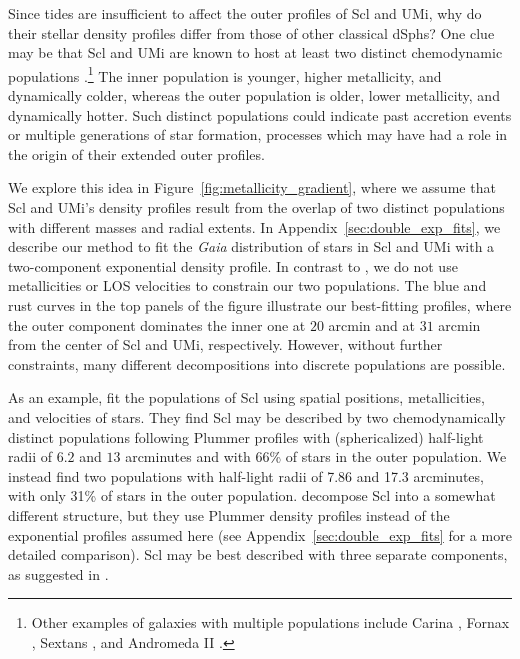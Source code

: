 \documentclass[times,trackchanges, twocolumn, twocolappendix]{aastex701}
\makeatletter
\DeclareRobustCommand\citepos
  {\begingroup
   \let\NAT@nmfmt\NAT@posfmt%
   \NAT@swafalse\let\NAT@ctype\z@\NAT@partrue
   \@ifstar{\NAT@fulltrue\NAT@citetp}{\NAT@fullfalse\NAT@citetp}}
\let\NAT@orig@nmfmt\NAT@nmfmt
\def\NAT@posfmt#1{\NAT@orig@nmfmt{#1's}}
\makeatother
\begin{document}
Since tides are insufficient to affect the outer profiles of  Scl and UMi, why do their stellar density profiles differ from those of other classical dSphs? One clue  may be that Scl and UMi are known to host at least two distinct chemodynamic populations \citep{tolstoy+2004, battaglia+2008, pace+2020}.\footnote{
    Other examples of galaxies with multiple populations
  include Carina \citep{battaglia+2012, fabrizio+2016, kordopatis+2016},
  Fornax
  \citep{battaglia+2006, amorisco+evans2012, delpino+aparicio+hidalgo2015},
  Sextans
  \citep{battaglia+2011, cicuendez+battaglia2018, roederer+2023}, and
  Andromeda II
  \citep{mcconnachie+arimoto+irwin2007, ho+2012, delpino+2017}.}
The inner population is younger, higher metallicity, and dynamically colder, whereas the outer
population is older, lower metallicity, and dynamically hotter.
Such distinct populations could indicate past accretion events or multiple generations of star formation, processes which may have had a role in the origin of their extended outer profiles.


We explore this idea in Figure~\ref{fig:metallicity_gradient}, where we assume that Scl and UMi's density profiles result from the overlap of two distinct populations with different masses and radial extents. In Appendix~\ref{sec:double_exp_fits}, we describe our method to fit the \textit{Gaia} distribution of stars in Scl and UMi with a two-component exponential density profile. In contrast to \citet{pace+2020, arroyo-polonio+2024}, we do not use metallicities or LOS velocities to constrain our two populations. The blue and rust curves in the top panels of the figure illustrate our best-fitting profiles, where the outer component dominates the inner one at $20$ arcmin and at $31$ arcmin from the center of Scl and UMi, respectively. 
However, without further constraints, many different decompositions into discrete populations are possible.

As an example, \citet{arroyo-polonio+2024} fit the populations of Scl using spatial positions, metallicities, and velocities of stars. They find Scl may be described by two chemodynamically distinct populations following Plummer profiles with (sphericalized) half-light radii of $6.2$ and $13$ arcminutes and with 66\% of stars in the outer population. We instead find two populations with half-light radii of 7.86 and 17.3 arcminutes, with only 31\% of stars in the outer population.  \citepos{arroyo-polonio+2024} decompose Scl into a somewhat different structure, but they use Plummer density profiles instead of the exponential profiles assumed here (see Appendix~\ref{sec:double_exp_fits} for a more detailed comparison). Scl may be best described with three separate components, as suggested in \citet{arroyo-polonio+2024}.
\end{document}
